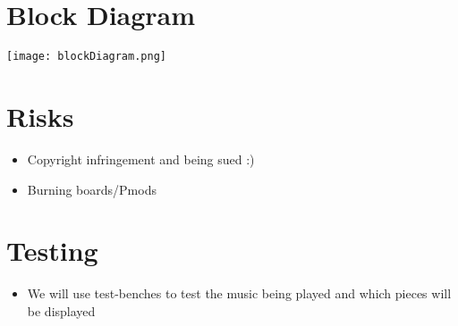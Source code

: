 \section{Block Diagram}
    \texttt{[image: blockDiagram.png]}
\section{Risks}
    \begin{itemize}
        \item Copyright infringement and being sued :)
        \item Burning boards/Pmods
    \end{itemize}
\section{Testing}
    \begin{itemize}
        \item We will use test-benches to test the music being played and which pieces will be displayed
    \end{itemize}
